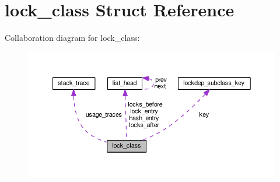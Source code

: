 \hypertarget{structlock__class}{}\section{lock\+\_\+class Struct Reference}
\label{structlock__class}


Collaboration diagram for lock\+\_\+class\+:
\nopagebreak
\begin{figure}[H]
\begin{center}
\leavevmode
\includegraphics[width=350pt]{structlock__class__coll__graph}
\end{center}
\end{figure}
